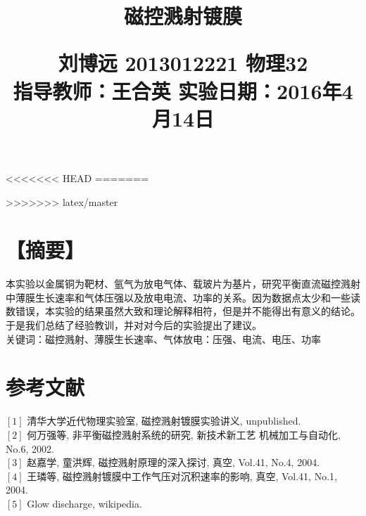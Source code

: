 \documentclass[10.5pt,a4paper]{ctexart}
\begin{document}
\fontsize{10.5pt}{15.75pt}\selectfont %
\title{磁控溅射镀膜\\
\begin{normalsize}
刘博远 2013012221 物理32\\指导教师：王合英 \quad 实验日期：2016年4月14日
\end{normalsize}
}
\date{}
\author{}
\maketitle

<<<<<<< HEAD
=======

>>>>>>> latex/master
\section*{【摘要】}
本实验以金属铜为靶材、氩气为放电气体、载玻片为基片，研究平衡直流磁控溅射中薄膜生长速率和气体压强以及放电电流、功率的关系。因为数据点太少和一些读数错误，本实验的结果虽然大致和理论解释相符，但是并不能得出有意义的结论。于是我们总结了经验教训，并对对今后的实验提出了建议。\\
\indent 关键词：磁控溅射、薄膜生长速率、气体放电：压强、电流、电压、功率
\section{参考文献}
\noindent
$[1]$ 清华大学近代物理实验室, 磁控溅射镀膜实验讲义, unpublished.\\
$[2]$ 何万强等, 非平衡磁控溅射系统的研究, 新技术新工艺 机械加工与自动化, No.6, 2002.\\
$[3]$ 赵嘉学, 童洪辉, 磁控溅射原理的深入探讨, 真空, Vol.41, No.4, 2004.\\
$[4]$ 王璘等, 磁控溅射镀膜中工作气压对沉积速率的影响, 真空, Vol.41, No.1, 2004.\\
$[5]$ Glow discharge, wikipedia. 
\end{document}
